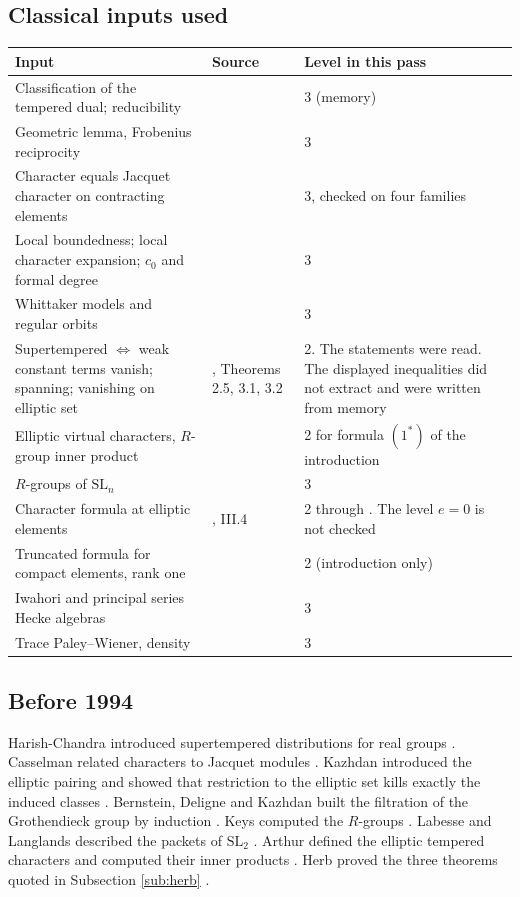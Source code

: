 \documentclass[12pt,letterpaper]{amsart}
\numberwithin{equation}{section}
\theoremstyle{definition}
\theoremstyle{remark}
\begin{document}
\subsection*{Classical inputs used}
\begin{center}\small
\begin{tabularx}{\linewidth}{@{}p{.33\linewidth}p{.2\linewidth}X@{}}\toprule
Input & Source & Level in this pass\\\midrule
Classification of the tempered dual; reducibility & \cite{GG63,Si79} & 3 (memory)\\
Geometric lemma, Frobenius reciprocity & \cite{Ca93} & 3\\
Character equals Jacquet character on contracting elements & \cite{Ca77} & 3, checked on four families\\
Local boundedness; local character expansion; $c_0$ and formal degree & \cite{HC99} & 3\\
Whittaker models and regular orbits & \cite{Ro75} & 3\\
Supertempered $\Leftrightarrow$ weak constant terms vanish; spanning; vanishing on elliptic set & \cite{He94}, Theorems 2.5, 3.1, 3.2 & 2. The statements were read. The displayed inequalities did not extract and were written from memory\\
Elliptic virtual characters, $R$-group inner product & \cite{Ar93} & 2 for formula $(1^*)$ of the introduction\\
$R$-groups of $\mathrm{SL}_n$ & \cite{Ke82} & 3\\
Character formula at elliptic elements & \cite{SS97}, III.4 & 2 through \cite{Ko04}. The level $e=0$ is not checked\\
Truncated formula for compact elements, rank one & \cite{Ko04} & 2 (introduction only)\\
Iwahori and principal series Hecke algebras & \cite{Bo76,Ro98} & 3\\
Trace Paley--Wiener, density & \cite{BDK86,Ka86} & 3\\\bottomrule
\end{tabularx}
\end{center}
\subsection*{Before 1994}
Harish-Chandra introduced supertempered distributions for real groups \cite{HC83}. Casselman related characters to Jacquet modules \cite{Ca77}. Kazhdan introduced the elliptic pairing and showed that restriction to the elliptic set kills exactly the induced classes \cite{Ka86}. Bernstein, Deligne and Kazhdan built the filtration of the Grothendieck group by induction \cite{BDK86}. Keys computed the $R$-groups \cite{Ke82}. Labesse and Langlands described the packets of $\mathrm{SL}_2$ \cite{LL79}. Arthur defined the elliptic tempered characters and computed their inner products \cite{Ar93}. Herb proved the three theorems quoted in Subsection \ref{sub:herb} \cite{He94}.
\end{document}
